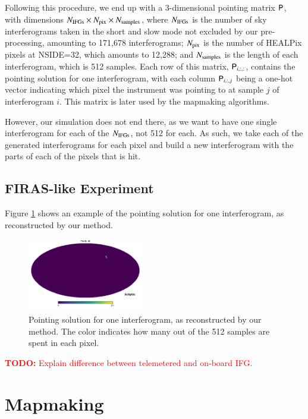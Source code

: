 \documentclass{aa}
\newcommand{\todo}[1]{\textcolor{red}{\textbf{TODO:} #1}}
\renewcommand{\P}[0]{\tens{P}}
\renewcommand{\P}[0]{\tens{P}}
\begin{document}
Following this procedure, we end up with a 3-dimensional pointing matrix $\P$, with dimensions $N_{\rm IFGs} \times N_{\rm pix} \times N_{\rm samples}$, where $N_{\rm IFGs}$ is the number of sky interferograms taken in the short and slow mode not excluded by our pre-processing, amounting to 171,678 interferograms; $N_{\rm pix}$ is the number of HEALPix pixels at NSIDE=32, which amounts to 12,288; and $N_{\rm samples}$ is the length of each interferogram, which is 512 samples. Each row of this matrix, $\P_{i,:,:}$, contains the pointing solution for one interferogram, with each column $\P_{i,:,j}$ being a one-hot vector indicating which pixel the instrument was pointing to at sample $j$ of interferogram $i$. This matrix is later used by the mapmaking algorithms.

However, our simulation does not end there, as we want to have one single interferogram for each of the $N_{\rm IFGs}$, not 512 for each. As such, we take each of the generated interferograms for each pixel and build a new interferogram with the parts of each of the pixels that is hit.

\subsection{FIRAS-like Experiment}
\label{sec:firas-like}

Figure \ref{fig:ifg-pointing} shows an example of the pointing solution for one interferogram, as reconstructed by our method.

\begin{figure}
      \centering
      \includegraphics[width=0.45\textwidth]{Figures/ifg_pointing.png} 
      \caption{Pointing solution for one interferogram, as reconstructed by our method. The color indicates how many out of the 512 samples are spent in each pixel.}
      \label{fig:ifg-pointing}
\end{figure}

\todo{Explain difference between telemetered and on-board IFG.}

\section{Mapmaking}
\end{document}
